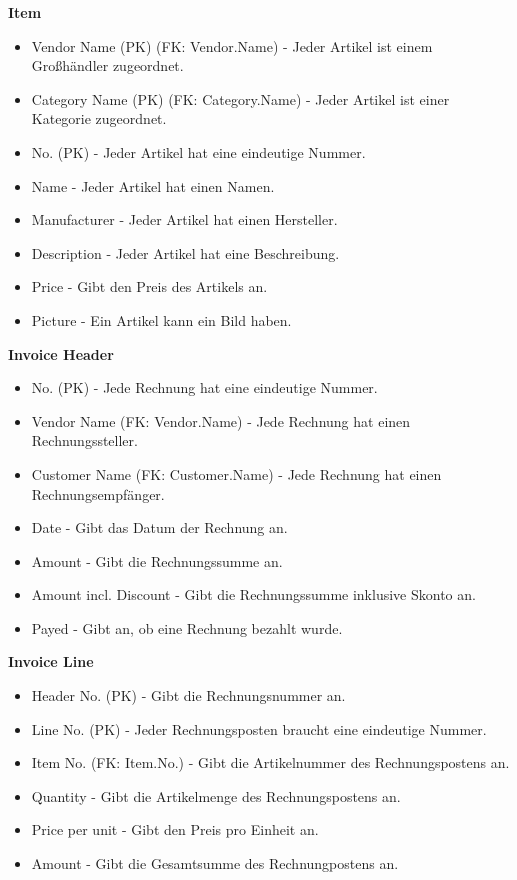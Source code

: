 \noindent \textbf{Item}
\begin{itemize}
    \item Vendor Name (PK) (FK: Vendor.Name) - Jeder Artikel ist einem Großhändler zugeordnet.
    \item Category Name (PK) (FK: Category.Name) - Jeder Artikel ist einer Kategorie zugeordnet.
    \item No. (PK) - Jeder Artikel hat eine eindeutige Nummer.
    \item Name - Jeder Artikel hat einen Namen.
    \item Manufacturer - Jeder Artikel hat einen Hersteller.
    \item Description - Jeder Artikel hat eine Beschreibung.
    \item Price - Gibt den Preis des Artikels an.
    \item Picture - Ein Artikel kann ein Bild haben.
\end{itemize}

\noindent \textbf{Invoice Header}
\begin{itemize}
    \item No. (PK) - Jede Rechnung hat eine eindeutige Nummer.
    \item Vendor Name (FK: Vendor.Name) - Jede Rechnung hat einen Rechnungssteller.
    \item Customer Name (FK: Customer.Name) - Jede Rechnung hat einen Rechnungsempfänger.
    \item Date - Gibt das Datum der Rechnung an.
    \item Amount - Gibt die Rechnungssumme an.
    \item Amount incl. Discount - Gibt die Rechnungssumme inklusive Skonto an.
    \item Payed - Gibt an, ob eine Rechnung bezahlt wurde.
\end{itemize}

\noindent \textbf{Invoice Line}
\begin{itemize}
    \item Header No. (PK) - Gibt die Rechnungsnummer an.
    \item Line No. (PK) -  Jeder Rechnungsposten braucht eine eindeutige Nummer.
    \item Item No. (FK: Item.No.) - Gibt die Artikelnummer des Rechnungspostens an.
    \item Quantity - Gibt die Artikelmenge des Rechnungspostens an.
    \item Price per unit - Gibt den Preis pro Einheit an.
    \item Amount - Gibt die Gesamtsumme des Rechnungpostens an.
\end{itemize}